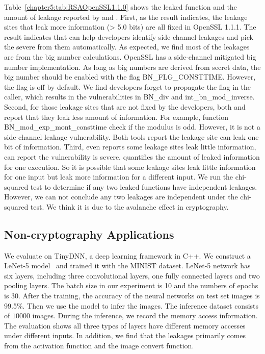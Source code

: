 Table~\ref{chapter5:tab:RSAOpenSSL1.1.0} shows the leaked function and the amount of leakage reported by \tool{} and \ctool{}. First, as the result indicates, the leakage sites that leak more information (> 5.0 bits) are all fixed in OpenSSL 1.1.1. The result indicates that \ctool{} can help developers identify side-channel leakages and pick the severe from them automatically. As expected, we find most of the leakages are from the big number calculations. OpenSSL has a side-channel mitigated big number implementation. As long as big numbers are derived from secret data, the big number should be enabled with the flag \textsf{BN\_FLG\_CONSTTIME}. However, the flag is off by default. We find developers forget to propagate the flag in the caller, which results in the vulnerabilities in \textsf{BN\_div} and \textsf{int\_bn\_mod\_inverse}. Second, for those leakage sites that are not fixed by the developers, both \tool{} and \ctool{} report that they leak less amount of information. For example, function \textsf{BN\_mod\_exp\_mont\_consttime} check if the modulus is odd. However, it is not a side-channel leakage vulnerability. Both tools report the leakage site can leak one bit of information. Third, even \tool{} reports some leakage sites leak little information, \ctool{} can report the vulnerability is severe. \tool{} quantifies the amount of leaked information for one execution. So it is possible that some leakage sites leak little information for one input but leak more information for a different input. We run the chi-squared test to determine if any two leaked functions have independent leakages. However, we can not conclude any two leakages are independent under the chi-squared test. We think it is due to the avalanche effect in cryptography.

\subsection{Non-cryptography Applications}



We evaluate \ctool{} on TinyDNN, a deep learning framework in C++. We construct a LeNet-5 model~\cite{lecun1998gradient} and trained it with the MINIST dataset. LeNet-5 network has six layers, including three convolutional layers, one fully connected layers and two pooling layers. The batch size in our experiment is 10 and the numbers of epochs is 30. After the training, the accuracy of the neural networks on test set images is 99.5\%. Then we use the model to infer the images. The inference dataset consists of $10000$ images.  During the inference, we record the memory access information. The evaluation shows all three types of layers have different memory accesses under different inputs. In addition, we find that the leakages primarily comes from the activation function and the image convert function.


